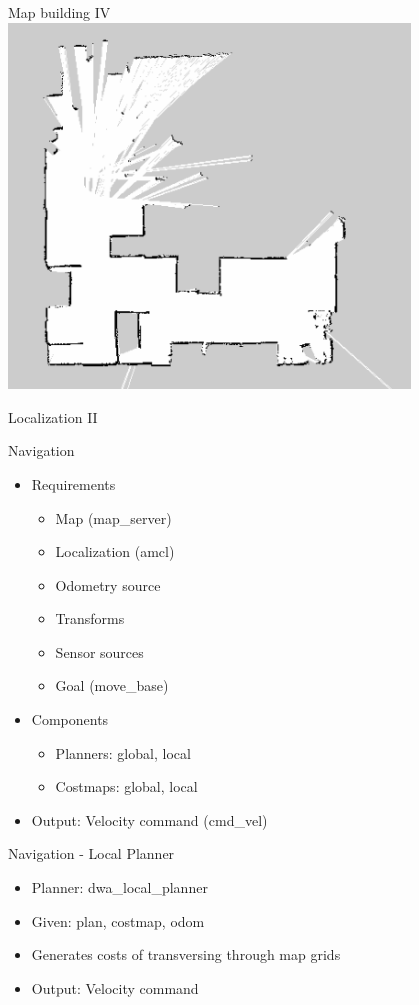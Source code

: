 \begin{frame}{Map building IV}
\centering
\includegraphics[width=0.8\textwidth]{gfx/map.png}
\end{frame}
\begin{frame}{Localization II}

\end{frame}
\begin{frame}{Navigation}
\begin{itemize}
	\item Requirements
		\begin{itemize}
			\item Map (map\_server)
			\item Localization (amcl)
			\item Odometry source
			\item Transforms
			\item Sensor sources
			\item Goal (move\_base) 
		\end{itemize}
	\item Components
		\begin{itemize}
			\item Planners: global, local
			\item Costmaps: global, local
		\end{itemize}
	\item Output: Velocity command (cmd\_vel)
\end{itemize}
\end{frame}
\begin{frame}{Navigation - Local Planner}
\begin{itemize}
	\item Planner: dwa\_local\_planner
	\item Given: plan, costmap, odom
	\item Generates costs of transversing through map grids
	\item Output: Velocity command
\end{itemize}
\end{frame}
